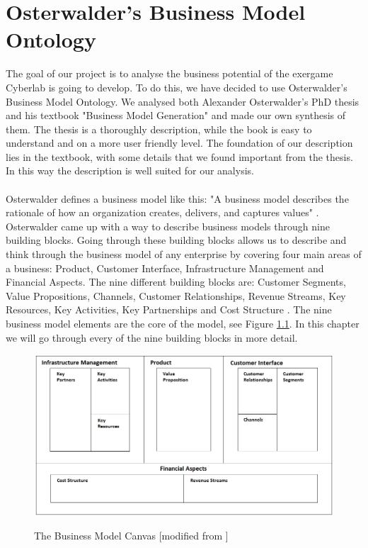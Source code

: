 \chapter{Osterwalder's Business Model Ontology}
The goal of our project is to analyse the business potential of the exergame Cyberlab is going to develop. To do this, we have decided to use Osterwalder's Business Model Ontology. We analysed both Alexander Osterwalder's PhD thesis \cite{osterwalderthesis} and his textbook "Business Model Generation" \cite{osterwalder} and made our own synthesis of them. The thesis is a thoroughly description, while the book is easy to understand and on a more user friendly level. The foundation of our description lies in the textbook, with some details that we found important from the thesis. In this way the description is well suited for our analysis.\\ \\
Osterwalder defines a business model like this: "A business model describes the rationale of how an organization creates, delivers, and captures values" \cite{osterwalder}. Osterwalder came up with a way to describe business models through nine building blocks. Going through these building blocks allows us to describe and think through the business model of any enterprise by covering four main areas of a business:  Product, Customer Interface, Infrastructure Management and Financial Aspects. The nine different building blocks are: Customer Segments, Value Propositions, Channels, Customer Relationships, Revenue Streams, Key Resources, Key Activities, Key Partnerships and Cost Structure \cite{osterwalder}. The nine business model elements are the core of the model, see Figure \ref{fig:TheBusinessModelCanvas}. 
In this chapter we will go through every of the nine building blocks in more detail. 

\begin{figure}
\centering
\scalebox{0.60}
{\includegraphics{osterwaldersbmmodified}}
\caption[The Business Model Canvas]{The Business Model Canvas [modified from \cite{osterwalder}]}
\label{fig:TheBusinessModelCanvas}
\end{figure}

